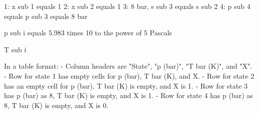 1: x sub 1 equals 1
2: x sub 2 equals 1
3: 8 bar, s sub 3 equals s sub 2
4: p sub 4 equals p sub 3 equals 8 bar

p sub i equals 5.983 times 10 to the power of 5 Pascals

T sub i

In a table format:
- Column headers are "State", "p (bar)", "T bar (K)", and "X".
- Row for state 1 has empty cells for p (bar), T bar (K), and X.
- Row for state 2 has an empty cell for p (bar), T bar (K) is empty, and X is 1.
- Row for state 3 has p (bar) as 8, T bar (K) is empty, and X is 1.
- Row for state 4 has p (bar) as 8, T bar (K) is empty, and X is 0.